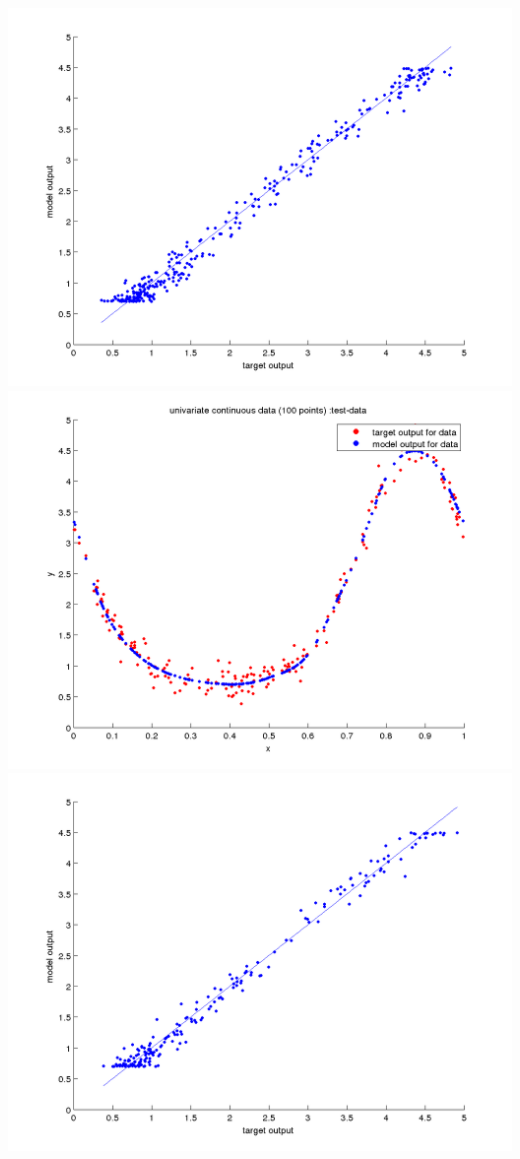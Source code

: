 \documentclass[fleqn]{article}
\begin{document}
\includegraphics[scale=0.4]{./pics/univariate100/_6/_6_epoch_Inf_validation-data_scatter2d}
\includegraphics[scale=0.4]{./pics/univariate100/_6/_6_epoch_Inf_test-data_scatter3d}
\includegraphics[scale=0.4]{./pics/univariate100/_6/_6_epoch_Inf_test-data_scatter2d}
\end{document}
